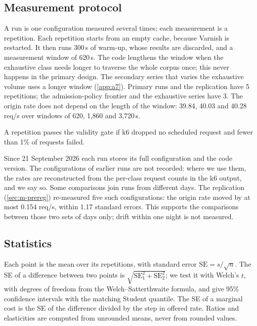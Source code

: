 \subsection{Measurement protocol}\label{sec:m-protocol}
A run is one configuration measured several times; each measurement is a repetition.
Each repetition starts from an empty cache, because Varnish is restarted.
It then runs 300\,s of warm-up, whose results are discarded, and a measurement window of
620\,s.
The code lengthens the window when the exhaustive class needs longer to traverse the
whole corpus once; this never happens in the primary design.
The secondary series that varies the exhaustive volume uses a longer window
(\cref{app:a7}).
Primary runs and the replication have 5 repetitions; the admission-policy frontier and
the exhaustive series have 3.
The origin rate does not depend on the length of the window: 39.84, 40.03 and
40.28 req/s over windows of 620, 1,860 and 3,720\,s.

A repetition passes the validity gate if k6 dropped no scheduled request and fewer than
1\% of requests failed.

Since 21 September 2026 each run stores its full configuration and the code version.
The configurations of earlier runs are not recorded: where we use them, the rates are
reconstructed from the per-class request counts in the k6 output, and we say
so.
Some comparisons join runs from different days.
The replication (\cref{sec:m-prereg}) re-measured five such configurations: the origin rate
moved by at most 0.154 req/s, within 1.17 standard errors.
This supports the comparisons between those two sets of days only; drift within one night
is not measured.

\subsection{Statistics}\label{sec:m-stats}
Each point is the mean over its repetitions, with standard error $\mathrm{SE} = s/\sqrt{n}$.
The SE of a difference between two points is $\sqrt{\mathrm{SE}_1^2 + \mathrm{SE}_2^2}$;
we test it with Welch's $t$, with degrees of freedom from the Welch--Satterthwaite
formula, and give 95\% confidence intervals with the matching Student quantile.
The SE of a marginal cost is the SE of the difference divided by the step in offered rate.
Ratios and elasticities are computed from unrounded means, never from rounded values.


